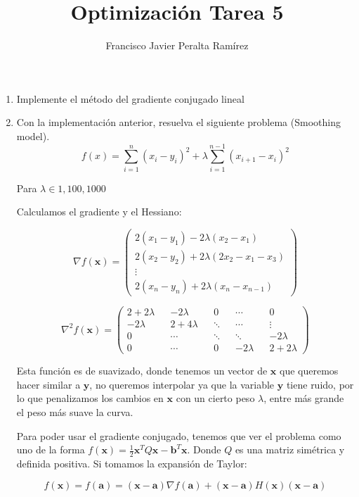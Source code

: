 \documentclass{article}
\title {Optimización Tarea 5}
\author {Francisco Javier Peralta Ramírez}
\begin{document}
\maketitle
\begin{enumerate}
\item Implemente el método del gradiente conjugado lineal
\item Con la implementación anterior, resuelva el siguiente problema (Smoothing
model).
$$f(x) = \sum_{i=1}^{n}(x_i - y_i)^2 + \lambda \sum_{i=1}^{n-1}(x_{i+1} - x_i)^2$$

Para $\lambda \in {1, 100, 1000}$

Calculamos el gradiente y el Hessiano:

$$\nabla f(\boldsymbol{x}) = 
 \begin{pmatrix}
  2(x_1 - y_1) - 2\lambda(x_2 - x_1)\\
  2(x_2 - y_2) + 2\lambda(2x_2 - x_1 - x_3) \\
  \vdots\\
  2(x_n - y_n) + 2\lambda(x_n - x_{n-1})
 \end{pmatrix}
$$

$$
\nabla^2f(\boldsymbol{x})= 
 \begin{pmatrix}
  2 + 2\lambda && - 2\lambda   && 0       && \cdots     && 0\\
  -2\lambda    && 2 + 4\lambda && \ddots  && \cdots     && \vdots\\
  0            && \cdots       && \ddots  && \ddots     && -2\lambda\\
  0            && \cdots       && 0       && -2\lambda  && 2 + 2\lambda
 \end{pmatrix}
$$

Esta función es de suavizado, donde tenemos un vector de $\boldsymbol{x}$ que queremos hacer similar a $\boldsymbol{y}$, no queremos interpolar ya que la variable $\boldsymbol{y}$ tiene ruido, por lo que penalizamos los cambios en $\boldsymbol{x}$ con un cierto peso $\lambda$, entre más grande el peso más suave la curva.

Para poder usar el gradiente conjugado, tenemos que ver el problema como uno de la forma $f(\boldsymbol{x}) = \frac{1}{2}\boldsymbol{x}^TQ\boldsymbol{x} - \boldsymbol{b}^T\boldsymbol{x}$. Donde $Q$ es una matriz simétrica y definida positiva. Si tomamos la expansión de Taylor:

$$f(\boldsymbol{x}) = f(\boldsymbol{a}) = (\boldsymbol{x} - \boldsymbol{a})\nabla f(\boldsymbol{a}) + (\boldsymbol{x} - \boldsymbol{a})H(\boldsymbol{x})(\boldsymbol{x} - \boldsymbol{a})$$


\end{enumerate}
\end{document}
